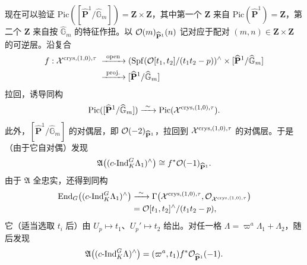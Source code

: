 现在可以验证 $\mathrm{Pic}([\widehat{\mathbf P}^1/\widehat{\mathbb G}_m])=\mathbf Z\times\mathbf Z$，其中第一个 $\mathbf Z$ 来自 $\mathrm{Pic}(\widehat{\mathbf P}^1)=\mathbf Z$，第二个 $\mathbf Z$ 来自按 $\widehat{\mathbb G}_m$ 的特征作扭。以 $\mathcal{O}(m)_{\widehat{\mathbf P}^1}(n)$ 记对应于配对 $(m,n)\in\mathbf Z\times\mathbf Z$ 的可逆层。沿复合
\[
\begin{aligned}
f:\XX^{\mathrm{crys},(1,0),\tau}\;&\xrightarrow{\ \text{open}\ }(\Spf(\OO[t_1,t_2]/(t_1t_2-p))^\wedge\times[\widehat{\mathbf P}^1/\widehat{\mathbb G}_m]\\
&\xrightarrow{\ \text{proj.}\ }[\widehat{\mathbf P}^1/\widehat{\mathbb G}_m]
\end{aligned}
\]
拉回，诱导同构
\[
\mathrm{Pic}([\widehat{\mathbf P}^1/\widehat{\mathbb G}_m])\xrightarrow{\ \sim\ }\mathrm{Pic}(\mathcal{X}^{\mathrm{crys},(1,0),\tau}).
\]
此外，$[\widehat{\mathbf P}^1/\widehat{\mathbb G}_m]$ 的对偶层，即 $\mathcal{O}(-2)_{\widehat{\mathbf P}^1}$，拉回到 $\mathcal{X}^{\mathrm{crys},(1,0),\tau}$ 的对偶层。于是（由于它自对偶）发现
\[
\mathfrak A\bigl((c\text{-Ind}_K^G\Lambda_1)^\wedge\bigr)\cong f^*\mathcal{O}(-1)_{\widehat{\mathbf P}^1}.
\]
由于 $\mathfrak A$ 全忠实，还得到同构
\[
\begin{aligned}
\operatorname{End}_G\bigl((c\text{-Ind}_K^G\Lambda_1)^\wedge\bigr)&\xrightarrow{\ \sim\ }\Gamma\bigl(\mathcal{X}^{\mathrm{crys},(1,0),\tau},\mathcal{O}_{\mathcal{X}^{\mathrm{crys},(1,0),\tau}}\bigr)\\
&=\mathcal{O}[t_1,t_2]^\wedge/(t_1t_2-p),
\end{aligned}
\]
它（适当选取 $t_i$ 后）由 $U_p\mapsto t_1$、$U_p'\mapsto t_2$ 给出。对任一格 $\Lambda=\varpi^a\Lambda_1+\Lambda_2$，随后发现
\[
\mathfrak A\bigl((c\text{-Ind}_K^G\Lambda)^\wedge\bigr)=(\varpi^a,t_1)f^*\mathcal{O}_{\widehat{\mathbf P}^1}(-1).
\]

